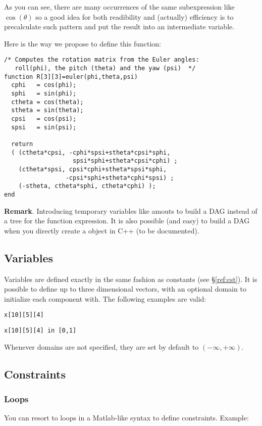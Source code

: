 As you can see, there are many occurrences of the same subexpression
like $\cos(\theta)$ so a good idea for both readibility and (actually) efficiency
is to precalculate such pattern and put the result into an intermediate variable.

Here is the way we propose to define this function:

\begin{verbatim}
/* Computes the rotation matrix from the Euler angles: 
   roll(phi), the pitch (theta) and the yaw (psi)  */
function R[3][3]=euler(phi,theta,psi)
  cphi   = cos(phi);
  sphi   = sin(phi);
  ctheta = cos(theta);
  stheta = sin(theta);
  cpsi   = cos(psi);
  spsi   = sin(psi);
  
  return 
  ( (ctheta*cpsi, -cphi*spsi+stheta*cpsi*sphi, 
                   spsi*sphi+stheta*cpsi*cphi) ; 
    (ctheta*spsi, cpsi*cphi+stheta*spsi*sphi, 
                 -cpsi*sphi+stheta*cphi*spsi) ;
    (-stheta, ctheta*sphi, ctheta*cphi) );
end
\end{verbatim}

{\bf Remark}. Introducing temporary variables like  amouts to build a DAG instead of
a tree for the function expression. It is also possible (and easy) to build a DAG when you directly create
a  object in C++ (to be documented).

\subsection{Variables}

Variables are defined exactly in the same fashion as constants (see \S\ref{ref:cst}).
It is possible to define up to three dimensional vectors, with an optional domain to initialize each
component with. The following examples are valid:

{\tt x[10][5][4]}

{\tt x[10][5][4] in [0,1]}

Whenever domains are not specified, they are set by default to $(-\infty,+\infty)$.

\subsection{Constraints}
\subsubsection{Loops}

You can resort to loops in a Matlab-like syntax to define constraints. Example:

